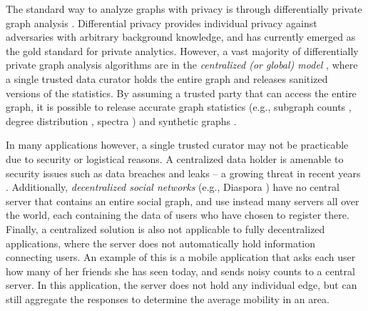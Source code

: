 The standard way to analyze graphs with privacy is through differentially private graph analysis \cite{Raskhodnikova_Encyclopedia16,DP,Dwork_ICALP06}. 
Differential privacy 
provides individual privacy against adversaries with arbitrary background knowledge, and has currently emerged as the gold standard for private analytics. 
However, a vast majority of differentially private graph analysis algorithms are in the \textit{centralized (or global) model} \cite{Blocki_FOCS12,Chen_PoPETs20,Day_SIGMOD16,Hay_ICDM09,Karwa_PVLDB11,Kasiviswanathan_TCC13,Nissim_STOC07,Raskhodnikova_arXiv15,Raskhodnikova_Encyclopedia16,Song_arXiv18,Wang_PAKDD13,Wang_TDP13}, where a single trusted data curator holds the entire graph and releases sanitized versions of the statistics. 
By assuming a trusted party that can access the entire graph, 
it is possible to release accurate graph statistics 
(e.g., subgraph counts \cite{Karwa_PVLDB11,Kasiviswanathan_TCC13,Song_arXiv18}, degree distribution \cite{Day_SIGMOD16,Hay_ICDM09,Raskhodnikova_arXiv15}, spectra \cite{Wang_PAKDD13}) 
and synthetic graphs \cite{Chen_PoPETs20,Wang_TDP13}. 

In many applications however, a single trusted curator may not be practicable due to security or logistical reasons. A centralized data holder is amenable to security issues such as data breaches and leaks -- a growing threat in recent years \cite{data_breach1,data_breach2}. Additionally, \textit{decentralized social networks} \cite{Paul_CN14,Salve_CSR18} (e.g., Diaspora \cite{Diaspora}) have no central server that contains an entire social graph, and use instead many servers all over the world, each containing the data of users who have chosen to register there.  Finally, a centralized solution is also not applicable to fully decentralized applications, where the server does not automatically hold information connecting users. An example of this is a mobile application that asks each user how many of 
her 
friends 
she has 
seen today, and sends noisy counts to a central server. In this application, the server does not hold any individual edge, but can still aggregate the responses to determine the average mobility in an area. 

